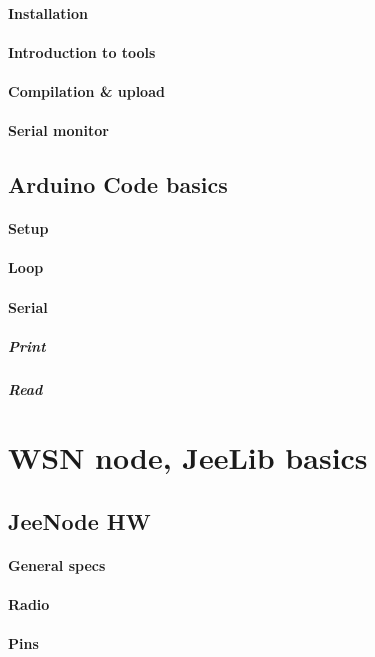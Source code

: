 \documentclass[12pt,titlepage]{article}
\begin{document}
		\paragraph{Installation}
		\paragraph{Introduction to tools}
		\paragraph{Compilation \& upload}
		\paragraph{Serial monitor}

	\subsection{Arduino Code basics}
		\paragraph{Setup}
		\paragraph{Loop}
		\paragraph{Serial}
			\subparagraph{Print}
			\subparagraph{Read}

\section{WSN node, JeeLib basics}

	\subsection{JeeNode HW }
		\paragraph{General specs}
		\paragraph{Radio}
		\paragraph{Pins}
\end{document}
